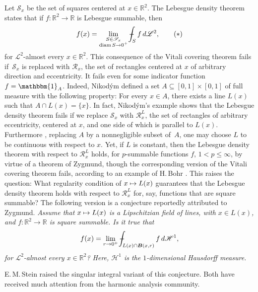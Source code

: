 \documentclass[JEP,XML,SOM,Unicode,ThmDefs,NoEqCountersInSection]{cedram}
\newcommand\mto{\mathchoice{\longmapsto}{\mapsto}{\mapsto}{\mapsto}}
\newcommand{\R}{\mathbb{R}}
\newcommand{\ind}{\mathbbm{1}}
\newcommand{\calH}{\mathscr{H}}
\newcommand{\calL}{\mathscr{L}}
\newcommand{\calR}{\mathscr{R}}
\newcommand{\calS}{\mathscr{S}}
\newcommand{\bB}{{\boldsymbol{B}}}
\DeclareMathOperator{\rmdiam}{\mathrm{diam}}
\def\Xint#1{\mathchoice
{\XXint\displaystyle\textstyle{#1}}{\XXint\textstyle\scriptstyle{#1}}{\XXint\scriptstyle\scriptscriptstyle{#1}}{\XXint\scriptscriptstyle
\scriptscriptstyle{#1}}\!\int}
\def\XXint#1#2#3{{\setbox0=\hbox{$#1{#2#3}{\int}$}
\vcenter{\hbox{$#2#3$}}\kern-.5\wd0}}
\def\dashint{\Xint-}
\let\subset\subseteq
\begin{document}
Let $\calS_x$ be the set of squares centered at $x \in \R^2$.
The Lebesgue density theorem states that if $f: \R^2 \to \R$ is Lebesgue summable, then\vspace*{-3pt}
\begin{equation}
\label{eq.intro}
f(x) = \lim_{\substack{S \in \calS_x\\\rmdiam S \to 0^+}} \dashint_S f \,d\calL^2,\tag{$*$}
\end{equation}
for $\calL^2$-almost every $x \in \R^2$.
This consequence of the Vitali covering theorem fails if~$\calS_x$ is replaced with $\calR_x$, the set of rectangles centered at $x$ of arbitrary direction and eccentricity.
It fails even for some indicator function $f = \ind_A$.
Indeed, Nikod\'ym \cite{NIK.27} defined a set $A \subset [0,1] \times [0,1]$ of full measure with the following property: For every $x \in A$, there exists a line $L(x)$ such that $A \cap L(x) = \{x\}$.
In fact, Nikod\'ym's example shows that the Lebesgue density theorem fails if we replace $\calS_x$ with $\calR_x^L$, the set of rectangles of arbitrary eccentricity, centered at $x$, and one side of which is parallel to $L(x)$.
Furthermore \cite[Chap.\,IV, Th.\,3.5]{GUZMAN.1981}, replacing $A$ by a nonnegligible subset of~$A$, one may choose $L$ to be continuous with respect to $x$.
Yet, if $L$ is constant, then the Lebesgue density theorem with respect to $\calR_x^L$ holds, for $p$-summable functions $f$, $1 < p \leq \infty$, by virtue of a theorem of Zygmund, though the corresponding version of the Vitali covering theorem fails, according to an example of H.\,Bohr \cite[Chap.\,IV, Th.\,1.1]{GUZMAN.1981}.
This raises the question: What regularity condition of $x \mto L(x)$ guarantees that the Lebesgue density theorem holds with respect to $\calR_x^L$ for, say, functions that are square summable?
The following version is a conjecture reportedly \cite{LAC.LI.10} attributed to Zygmund.
{\it
Assume that $x \mto L(x)$ is a Lipschitzian field of lines, with $x \in L(x)$, and $f: \R^2 \to \R$ is square summable.
Is it true that\vspace*{-3pt}
\begin{equation*}
f(x) = \lim_{r \to 0^+} \dashint_{L(x) \cap \bB(x,r)} f \,d\calH^1,
\end{equation*}
for $\calL^2$-almost every $x \in \R^2$?
Here, $\calH^1$ is the $1$-dimensional Hausdorff measure.
}
\par
E.\,M.\,Stein raised the singular integral variant of this conjecture.
Both have received much attention from the harmonic analysis community.
\end{document}

